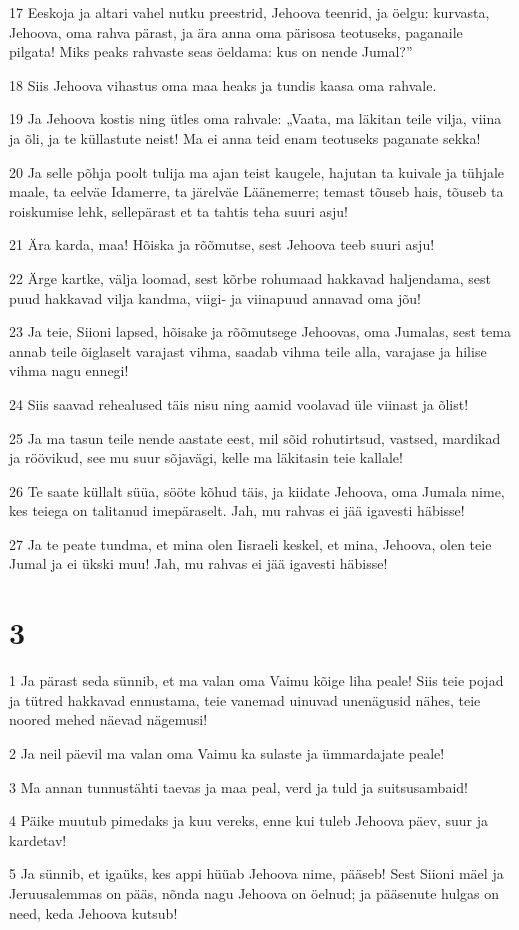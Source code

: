 \par 17 Eeskoja ja altari vahel nutku preestrid, Jehoova teenrid, ja öelgu: kurvasta, Jehoova, oma rahva pärast, ja ära anna oma pärisosa teotuseks, paganaile pilgata! Miks peaks rahvaste seas öeldama: kus on nende Jumal?”
\par 18 Siis Jehoova vihastus oma maa heaks ja tundis kaasa oma rahvale.
\par 19 Ja Jehoova kostis ning ütles oma rahvale: „Vaata, ma läkitan teile vilja, viina ja õli, ja te küllastute neist! Ma ei anna teid enam teotuseks paganate sekka!
\par 20 Ja selle põhja poolt tulija ma ajan teist kaugele, hajutan ta kuivale ja tühjale maale, ta eelväe Idamerre, ta järelväe Läänemerre; temast tõuseb hais, tõuseb ta roiskumise lehk, sellepärast et ta tahtis teha suuri asju!
\par 21 Ära karda, maa! Hõiska ja rõõmutse, sest Jehoova teeb suuri asju!
\par 22 Ärge kartke, välja loomad, sest kõrbe rohumaad hakkavad haljendama, sest puud hakkavad vilja kandma, viigi- ja viinapuud annavad oma jõu!
\par 23 Ja teie, Siioni lapsed, hõisake ja rõõmutsege Jehoovas, oma Jumalas, sest tema annab teile õiglaselt varajast vihma, saadab vihma teile alla, varajase ja hilise vihma nagu ennegi!
\par 24 Siis saavad rehealused täis nisu ning aamid voolavad üle viinast ja õlist!
\par 25 Ja ma tasun teile nende aastate eest, mil sõid rohutirtsud, vastsed, mardikad ja röövikud, see mu suur sõjavägi, kelle ma läkitasin teie kallale!
\par 26 Te saate küllalt süüa, sööte kõhud täis, ja kiidate Jehoova, oma Jumala nime, kes teiega on talitanud imepäraselt. Jah, mu rahvas ei jää igavesti häbisse!
\par 27 Ja te peate tundma, et mina olen Iisraeli keskel, et mina, Jehoova, olen teie Jumal ja ei ükski muu! Jah, mu rahvas ei jää igavesti häbisse!

\chapter{3}

\par 1 Ja pärast seda sünnib, et ma valan oma Vaimu kõige liha peale! Siis teie pojad ja tütred hakkavad ennustama, teie vanemad uinuvad unenägusid nähes, teie noored mehed näevad nägemusi!
\par 2 Ja neil päevil ma valan oma Vaimu ka sulaste ja ümmardajate peale!
\par 3 Ma annan tunnustähti taevas ja maa peal, verd ja tuld ja suitsusambaid!
\par 4 Päike muutub pimedaks ja kuu vereks, enne kui tuleb Jehoova päev, suur ja kardetav!
\par 5 Ja sünnib, et igaüks, kes appi hüüab Jehoova nime, pääseb! Sest Siioni mäel ja Jeruusalemmas on pääs, nõnda nagu Jehoova on öelnud; ja pääsenute hulgas on need, keda Jehoova kutsub!

